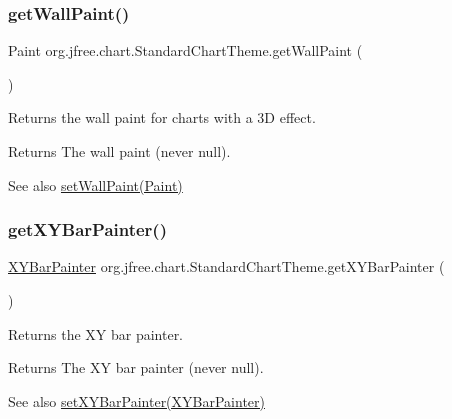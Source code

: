 \subsubsection{\texorpdfstring{get\+Wall\+Paint()}{getWallPaint()}}
{\footnotesize\ttfamily Paint org.\+jfree.\+chart.\+Standard\+Chart\+Theme.\+get\+Wall\+Paint (\begin{DoxyParamCaption}{ }\end{DoxyParamCaption})}

Returns the wall paint for charts with a 3D effect.

\begin{DoxyReturn}{Returns}
The wall paint (never {\ttfamily null}).
\end{DoxyReturn}
\begin{DoxySeeAlso}{See also}
\mbox{\hyperlink{classorg_1_1jfree_1_1chart_1_1_standard_chart_theme_ad557cec57bc9f3888e819d1cf866ebc6}{set\+Wall\+Paint(\+Paint)}} 
\end{DoxySeeAlso}
\mbox{\label{classorg_1_1jfree_1_1chart_1_1_standard_chart_theme_ab9ded4fbaa81ef9ca7b492015c0a8dc6}} 
\subsubsection{\texorpdfstring{get\+X\+Y\+Bar\+Painter()}{getXYBarPainter()}}
{\footnotesize\ttfamily \mbox{\hyperlink{interfaceorg_1_1jfree_1_1chart_1_1renderer_1_1xy_1_1_x_y_bar_painter}{X\+Y\+Bar\+Painter}} org.\+jfree.\+chart.\+Standard\+Chart\+Theme.\+get\+X\+Y\+Bar\+Painter (\begin{DoxyParamCaption}{ }\end{DoxyParamCaption})}

Returns the XY bar painter.

\begin{DoxyReturn}{Returns}
The XY bar painter (never {\ttfamily null}).
\end{DoxyReturn}
\begin{DoxySeeAlso}{See also}
\mbox{\hyperlink{classorg_1_1jfree_1_1chart_1_1_standard_chart_theme_ae553e9cbfe91c5d6bd54b4c03ca01a35}{set\+X\+Y\+Bar\+Painter(\+X\+Y\+Bar\+Painter)}} 
\end{DoxySeeAlso}
\mbox{\label{classorg_1_1jfree_1_1chart_1_1_standard_chart_theme_a4abce207e347a70e28c6aa7fe3780fe0}} 
